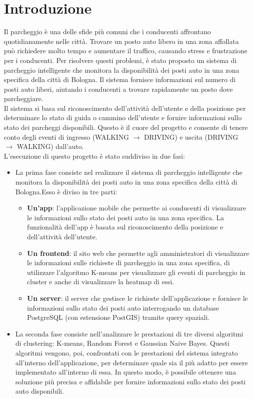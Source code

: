 \documentclass[../../Report.tex]{subfiles}
\begin{document}
    \chapter{Introduzione}
    Il parcheggio è una delle sfide più comuni che i conducenti affrontano quotidianamente nelle città. Trovare un posto auto libero in una zona affollata può richiedere molto tempo e aumentare il traffico, causando stress e frustrazione per i conducenti. Per risolvere questi problemi, è stato proposto un sistema di parcheggio intelligente che monitora la disponibilità dei posti auto in una zona specifica della città di Bologna. Il sistema fornisce informazioni sul numero di posti auto liberi, aiutando i conducenti a trovare rapidamente un posto dove parcheggiare.\\
    Il sistema si basa sul riconoscimento dell'attività dell'utente e della posizione per determinare lo stato di guida o cammino dell'utente e fornire informazioni sullo stato dei parcheggi disponibili. Questo è il cuore del progetto e consente di tenere conto degli eventi di ingresso (WALKING $\rightarrow$ DRIVING) e uscita (DRIVING $\rightarrow$ WALKING) dall'auto.\\
    L'esecuzione di questo progetto è stato suddiviso in due fasi:
    \begin{itemize}
        \item La prima fase consiste nel realizzare il sistema di parcheggio intelligente che monitora la disponibilità dei posti auto in una zona specifica della città di Bologna.Esso è diviso in tre parti:
        \begin{itemize}
            \item \textbf{Un'app}: l'applicazione mobile che permette ai conducenti di visualizzare le informazioni sullo stato dei posti auto in una zona specifica. La funzionalità dell'app è basata sul riconoscimento della posizione e dell'attività dell'utente.
            \item \textbf{Un frontend}: il sito web che permette agli amministratori di visualizzare le informazioni sulle richieste di parcheggio in una zona specifica, di utilizzare l'algoritmo K-means per visualizzare gli eventi di parcheggio in cluster e anche di visualizzare la heatmap di essi.
            \item \textbf{Un server}: il server che gestisce le richieste dell'applicazione e fornisce le informazioni sullo stato dei posti auto interrogando un database PostgreSQL (con estensione PostGIS) tramite query spaziali.
        \end{itemize}
        \item La seconda fase consiste nell'analizzare le prestazioni di tre diversi algoritmi di clustering: K-means, Random Forest e Gaussian Naive Bayes. Questi algoritmi vengono, poi, confrontati con le prestazioni del sistema integrato all'interno dell'applicazione, per determinare quale sia il più adatto per essere implementato all'interno di essa. In questo modo, è possibile ottenere una soluzione più precisa e affidabile per fornire informazioni sullo stato dei posti auto disponibili. 
    \end{itemize}
\end{document}
